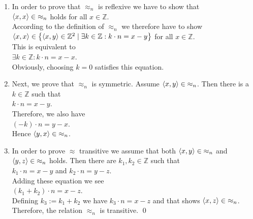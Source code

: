 \begin{enumerate}
\item In order to prove that $\approx_n$ is reflexive we have to show that
      \\[0.2cm]
      \hspace*{1.3cm}
      $\pair(x,x) \in\; \approx_n$ \quad holds for all $x \in \mathbb{Z}$.
      \\[0.2cm]
      According to the definition of $\approx_n$
      we therefore have to show \\[0.2cm]
      \hspace*{1.3cm}
      $\pair(x,x) \in \bigl\{ \pair(x,y) \in \mathbb{Z}^2 \mid \exists k \in \mathbb{Z}: k
      \cdot n = x - y \bigr\}$ \quad for all $x \in \mathbb{Z}$.
      \\[0.2cm]
      This is equivalent to \\[0.2cm]
      \hspace*{1.3cm}
      $\exists k \in \mathbb{Z}: k \cdot n = x - x$.
      \\[0.2cm]
      Obviously, choosing $k=0$ satisfies this equation.
\item Next, we prove that $\approx_n$ is symmetric.  Assume 
      $\pair(x,y) \in\; \approx_n$.  Then there is a  $k \in \mathbb{Z}$ such that
      \\[0.2cm]
      \hspace*{1.3cm}      
      $k\cdot n = x - y$.
      \\[0.2cm] 
      Therefore, we also have
      \\[0.2cm]
      \hspace*{1.3cm}      
      $(-k)\cdot n = y - x$.
      \\[0.2cm]
      Hence $\pair(y,x) \in\; \approx_n$.
\item In order to prove $\approx$ transitive we assume that both
       $\pair(x,y) \in\; \approx_n$ and $\pair(y,z) \in\; \approx_n$ holds.  Then there
       are $k_1,k_2 \in \mathbb{Z}$ such that
      \\[0.2cm]
      \hspace*{1.3cm}      
      $k_1 \cdot n = x - y$ \quad and \quad $k_2 \cdot n = y - z$.
      \\[0.2cm]
      Adding these equation we see
      \\[0.2cm]
      \hspace*{1.3cm}      
      $(k_1 + k_2) \cdot n = x - z$.
      \\[0.2cm]
      Defining  $k_3 := k_1 + k_2$ we have $k_3\cdot n = x - z$ and that shows
      $\pair(x,z) \in\; \approx_n$.   Therefore, the relation $\approx_n$ is transitive.  \qed
\end{enumerate}

